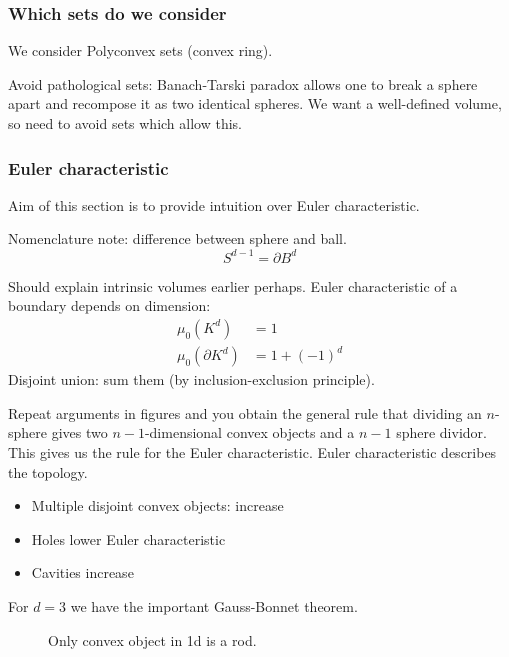 \subsubsection{Which sets do we consider}

We consider Polyconvex sets (convex ring).

Avoid pathological sets: Banach-Tarski paradox allows one to break a sphere apart and recompose it as two identical spheres.
We want a well-defined volume, so need to avoid sets which allow this.

\subsubsection{Euler characteristic}

Aim of this section is to provide intuition over Euler characteristic.

\begin{tcolorbox}
  Nomenclature note: difference between sphere and ball.
  \begin{equation*}
    S^{d-1} = \partial B^d
  \end{equation*}
\end{tcolorbox}

Should explain intrinsic volumes earlier perhaps.
Euler characteristic of a boundary depends on dimension:
\begin{align}
  \mu_0(K^d) &= 1 \\
  \mu_0(\partial K^d) &= 1 + (-1)^d
\end{align}
Disjoint union: sum them (by inclusion-exclusion principle).

Repeat arguments in figures and you obtain the general rule that dividing an $n$-sphere gives two $n-1$-dimensional convex objects and a $n-1$ sphere dividor.
This gives us the rule for the Euler characteristic.
Euler characteristic describes the topology.

\begin{itemize}
\item Multiple disjoint convex objects: increase
\item Holes lower Euler characteristic
\item Cavities increase
\end{itemize}

For $d=3$ we have the important Gauss-Bonnet theorem.

\begin{SCfigure}[H]
  \caption{Only convex object in 1d is a rod.}
\end{SCfigure}

